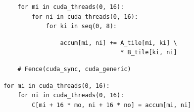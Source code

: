 \begin{minipage}[t]{0.4\textwidth}
\begin{mdframed}[style=MyFrame, backgroundcolor=greenBoxBg]
\begin{verbatim}
\end{verbatim}
\end{mdframed}
\begin{verbatim}
                for mi in cuda_threads(0, 16):
                    for ni in cuda_threads(0, 16):
                        for ki in seq(0, 8):
\end{verbatim}
\begin{mdframed}[style=MyFrame, backgroundcolor=violetBoxBg]
\color{violetBoxFg}
\begin{verbatim}
                            accum[mi, ni] += A_tile[mi, ki] \
                                             * B_tile[ki, ni]
\end{verbatim}
\end{mdframed}
\begin{mdframed}[style=MyFrame, backgroundcolor=redBoxBg]
\color{redBoxFg}
\begin{verbatim}
                # Fence(cuda_sync, cuda_generic)
\end{verbatim}
\end{mdframed}
\begin{verbatim}
            for mi in cuda_threads(0, 16):
                for ni in cuda_threads(0, 16):
                    C[mi + 16 * mo, ni + 16 * no] = accum[mi, ni]
\end{verbatim}

\end{minipage}
\hfill
